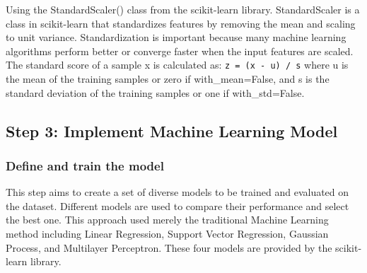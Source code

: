 \documentclass{article}
\begin{document}
Using the StandardScaler() class from the scikit-learn library.
StandardScaler is a class in scikit-learn that standardizes features by
removing the mean and scaling to unit variance. Standardization is
important because many machine learning algorithms perform better or
converge faster when the input features are scaled. The standard score
of a sample x is calculated as: \texttt{z\ =\ (x\ -\ u)\ /\ s} where u
is the mean of the training samples or zero if with\_mean=False, and s
is the standard deviation of the training samples or one if
with\_std=False.

\begin{Shaded}
\begin{Highlighting}[]
\end{Highlighting}
\end{Shaded}

\begin{Shaded}
\begin{Highlighting}[]
\OperatorTok{=}
\OperatorTok{=}
\end{Highlighting}
\end{Shaded}

\subsection{Step 3: Implement Machine Learning
Model}\label{step-3-implement-machine-learning-model}

\subsubsection{Define and train the
model}\label{define-and-train-the-model}

This step aims to create a set of diverse models to be trained and
evaluated on the dataset. Different models are used to compare their
performance and select the best one. This approach used merely the
traditional Machine Learning method including Linear Regression, Support
Vector Regression, Gaussian Process, and Multilayer Perceptron. These
four models are provided by the scikit-learn library.

\begin{Shaded}
\begin{Highlighting}[]
\end{Highlighting}
\end{Shaded}
\end{document}

